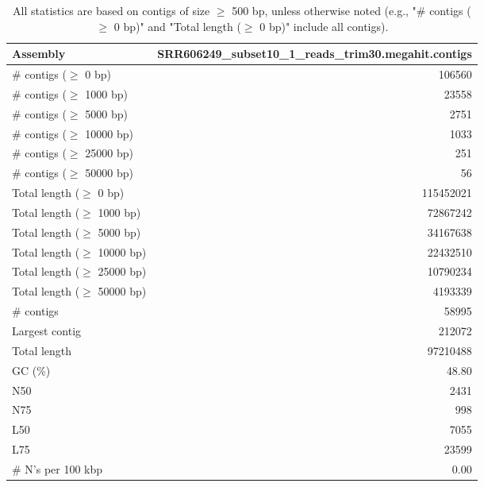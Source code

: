 \documentclass[12pt,a4paper]{article}
\begin{document}
\begin{table}[ht]
\begin{center}
\caption{All statistics are based on contigs of size $\geq$ 500 bp, unless otherwise noted (e.g., "\# contigs ($\geq$ 0 bp)" and "Total length ($\geq$ 0 bp)" include all contigs).}
\begin{tabular}{|l*{1}{|r}|}
\hline
Assembly & SRR606249\_subset10\_1\_reads\_trim30.megahit.contigs \\ \hline
\# contigs ($\geq$ 0 bp) & 106560 \\ \hline
\# contigs ($\geq$ 1000 bp) & 23558 \\ \hline
\# contigs ($\geq$ 5000 bp) & 2751 \\ \hline
\# contigs ($\geq$ 10000 bp) & 1033 \\ \hline
\# contigs ($\geq$ 25000 bp) & 251 \\ \hline
\# contigs ($\geq$ 50000 bp) & 56 \\ \hline
Total length ($\geq$ 0 bp) & 115452021 \\ \hline
Total length ($\geq$ 1000 bp) & 72867242 \\ \hline
Total length ($\geq$ 5000 bp) & 34167638 \\ \hline
Total length ($\geq$ 10000 bp) & 22432510 \\ \hline
Total length ($\geq$ 25000 bp) & 10790234 \\ \hline
Total length ($\geq$ 50000 bp) & 4193339 \\ \hline
\# contigs & 58995 \\ \hline
Largest contig & 212072 \\ \hline
Total length & 97210488 \\ \hline
GC (\%) & 48.80 \\ \hline
N50 & 2431 \\ \hline
N75 & 998 \\ \hline
L50 & 7055 \\ \hline
L75 & 23599 \\ \hline
\# N's per 100 kbp & 0.00 \\ \hline
\end{tabular}
\end{center}
\end{table}
\end{document}
